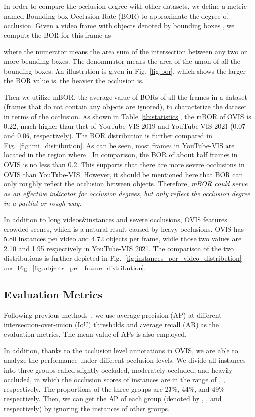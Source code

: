 \documentclass[twocolumn]{svjour3}          \smartqed  \usepackage{graphicx}
\begin{document}
\begin{sloppypar}
In order to compare the occlusion degree with other datasets, we define a metric named Bounding-box Occlusion Rate (BOR) to approximate the degree of occlusion. Given a video frame with  objects denoted by bounding boxes , we compute the BOR for this frame as

where the numerator means the area sum of the intersection between any two or more bounding boxes.
The denominator means the area of the union of all the bounding boxes. An illustration is given in Fig.~\ref{fig:bor}, which shows the larger the BOR value is, the heavier the occlusion is. 

Then we utilize mBOR, the average value of BORs of all the frames in a dataset (frames that do not contain any objects are ignored), to characterize the dataset in terms of the occlusion. As shown in Table~\ref{tb:statistics}, the mBOR of OVIS is 0.22, much higher than that of YouTube-VIS 2019 and YouTube-VIS 2021 (0.07 and 0.06, respectively). The BOR distribution is further compared in Fig.~\ref{fig:imi_distribution}. As can be seen, most frames in YouTube-VIS are located in the region where . In comparison, the BOR of about half frames in OVIS is no less than 0.2. This supports that there are more severe occlusions in OVIS than YouTube-VIS.
However, it should be mentioned here that BOR can only roughly reflect the occlusion between objects. Therefore, \textit{mBOR could serve as an effective indicator for occlusion degrees, but only reflect the occlusion degree in a partial or rough way}. 

In addition to long videos\&instances and severe occlusions, OVIS features crowded scenes, which is a natural result caused by heavy occlusions. OVIS has 5.80 instances per video and 4.72 objects per frame, while those two values are 2.10 and 1.95 respectively in YouTube-VIS 2021. The comparison of the two distributions is further depicted in Fig.~\ref{fig:instances_per_video_distribution} and Fig.~\ref{fig:objects_per_frame_distribution}. 

\subsection{Evaluation Metrics}
\label{metric}

Following previous methods~\cite{youtube_vis}, we use
average precision (AP) at different intersection-over-union
(IoU) thresholds and average recall (AR) as the evaluation
metrics. The mean value of APs is also employed.

In addition, thanks to the occlusion level annotations in OVIS, we are able to analyze the performance under different occlusion levels. We divide all instances into three groups called slightly occluded, moderately occluded, and heavily occluded, in which the occlusion scores of instances are in the range of , ,  respectively. The proportions of the three groups are 23\%, 44\%, and 49\% respectively. Then, we can get the AP of each group (denoted by , , and  respectively) by ignoring the instances of other groups.





\end{sloppypar}
\end{document}
